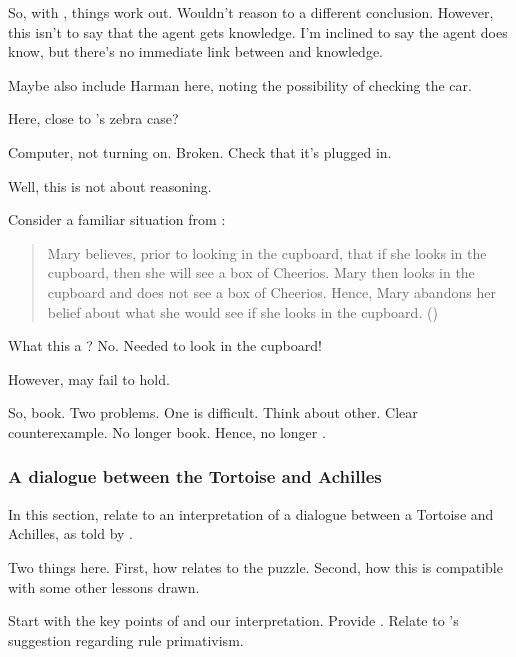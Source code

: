 \begin{note}
  So, with \citeauthor{Dretske:1970to}, things work out.
  Wouldn't reason to a different conclusion.
  However, this isn't to say that the agent gets knowledge.
  I'm inclined to say the agent does know, but there's no immediate link between \qzS{} and knowledge.

  Maybe also include Harman here, noting the possibility of checking the car.
\end{note}

\begin{note}
  Here, close to \citeauthor{Dretske:1970to}'s zebra case?
\end{note}

\begin{note}
  \begin{illustration}
    Computer, not turning on.
    Broken.
    Check that it's plugged in.
  \end{illustration}

  Well, this is not about reasoning.
\end{note}

\begin{note}
  Consider a familiar situation from \citeauthor{Harman:1986ux}:

  \begin{quote}
    Mary believes, prior to looking in the cupboard, that if she looks in the cupboard, then she will see a box of Cheerios.
    Mary then looks in the cupboard and does not see a box of Cheerios.
    Hence, Mary abandons her belief about what she would see if she looks in the cupboard.\nolinebreak
    \mbox{}\hfill\mbox{(\citeyear[Cf.][Chs.1\&2]{Harman:1986ux})}
  \end{quote}

  What this a \requ{}?
  No.
  Needed to look in the cupboard!

  However, \requ{} may fail to hold.

  So, book.
  Two problems.
  One is difficult.
  Think about other.
  Clear counterexample.
  No longer book.
  Hence, no longer \requ{}.
\end{note}

\subsubsection[The Tortoise and Achilles]{A dialogue between the Tortoise and Achilles}
\label{cha:zS:sec:question:illu:carroll}

\begin{note}
  In this section, relate \qzS{} to an interpretation of a dialogue between a Tortoise and Achilles, as told by \textcite{Carroll:1895uj}.

  Two things here.
  First, how \qzS{} relates to the puzzle.
  Second, how this is compatible with some other lessons drawn.

  Start with the key points of \textcite{Carroll:1895uj} and our interpretation.
  Provide .
  Relate to \citeauthor{Boghossian:2008vf}'s suggestion regarding rule primativism.
\end{note}

